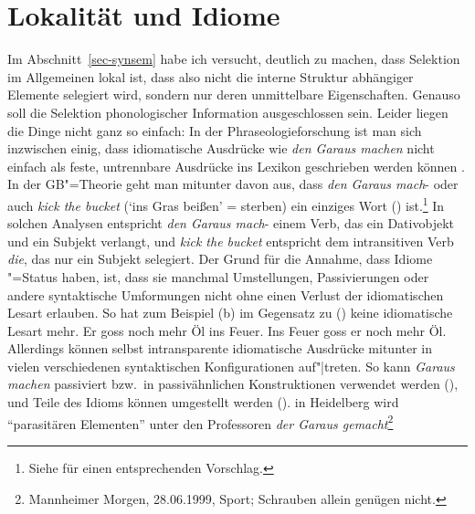 \section{Lokalität und Idiome}
\label{disc-lokalitaet}

%
Im Abschnitt~\ref{sec-synsem} habe ich versucht, deutlich zu machen, dass Selektion im Allgemeinen
lokal ist, dass also nicht die interne Struktur abhängiger Elemente selegiert
wird, sondern nur deren unmittelbare Eigenschaften. Genauso soll die Selektion phonologischer
Information ausgeschlossen sein. Leider liegen die Dinge nicht ganz so einfach:
In der Phraseologieforschung ist man sich inzwischen einig, dass idiomatische Ausdrücke wie
\emph{den Garaus machen} nicht einfach als feste, untrennbare Ausdrücke ins Lexikon geschrieben werden
können \citep*{NSW94a,Burger98a}. In der GB"=Theorie geht man mitunter davon aus, dass \emph{den Garaus mach}- oder
auch \emph{kick the bucket} (`ins Gras beißen' = sterben) ein einziges Wort (\vnull) ist.\footnote{
  Siehe \zb {} für einen entsprechenden Vorschlag.%
}
In solchen Analysen entspricht \emph{den Garaus mach}- einem Verb, das ein Dativobjekt und ein Subjekt verlangt,
und \emph{kick the bucket} entspricht dem intransitiven Verb \emph{die}, das nur ein Subjekt
selegiert. Der Grund für die Annahme, dass Idiome \vnull"=Status haben, ist, dass sie manchmal
Umstellungen, Passivierungen oder andere syntaktische Umformungen nicht ohne einen Verlust der
idiomatischen Lesart erlauben. So hat zum Beispiel (b) im Gegensatz zu () keine
idiomatische Lesart mehr.
\eal
\ex Er goss noch mehr Öl ins Feuer.
\ex Ins Feuer goss er noch mehr Öl.
\zl
Allerdings können selbst intransparente idiomatische Ausdrücke mitunter in vielen verschiedenen syntaktischen Konfigurationen auf"|treten.
So kann \emph{Garaus machen} \zb passiviert bzw.\ in passivähnlichen Konstruktionen
verwendet werden (), und Teile des Idioms können umgestellt werden ().
\ea
in Heidelberg wird "`parasitären Elementen"' unter den Professoren \emph{der Garaus gemacht}\footnote{
Mannheimer Morgen, 28.06.1999, Sport; Schrauben allein genügen nicht.%
}
\z

